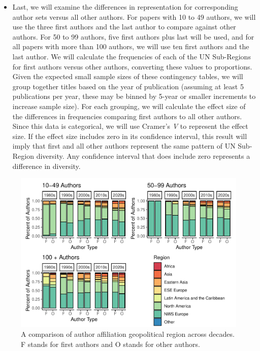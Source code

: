 \documentclass[
  man]{apa7}
\providecommand{\tightlist}{%
  \setlength{\itemsep}{0pt}\setlength{\parskip}{0pt}}
\begin{document}
\begin{itemize}
\tightlist
\item
  Last, we will examine the differences in representation for
  corresponding author sets versus all other authors. For papers with
  10 to 49 authors, we will use the three first authors and the last
  author to compare against other authors. For 50 to 99 authors, five
  first authors plus last will be used, and for all papers with more
  than 100 authors, we will use ten first authors and the last author.
  We will calculate the frequencies of each of the UN Sub-Regions for
  first authors versus other authors, converting these values to
  proportions. Given the expected small sample sizes of these
  contingency tables, we will group together titles based on the year
  of publication (assuming at least 5 publications per year, these may
  be binned by 5-year or smaller increments to increase sample size).
  For each grouping, we will calculate the effect size of the
  differences in frequencies comparing first authors to all other
  authors. Since this data is categorical, we will use Cramer's \emph{V} to
  represent the effect size. If the effect size includes zero in its
  confidence interval, this result will imply that first and all other
  authors represent the same pattern of UN Sub-Region diversity. Any
  confidence interval that does include zero represents a difference
  in diversity.
\end{itemize}

\begin{figure}
\centering
\includegraphics{manuscript_scopus_files/figure-latex/author-gpe-figure-1.pdf}
\caption{\label{fig:author-gpe-figure}A comparison of author affiliation geopolitical region across decades. F stands for first authors and O stands for other authors.}
\end{figure}
\end{document}
